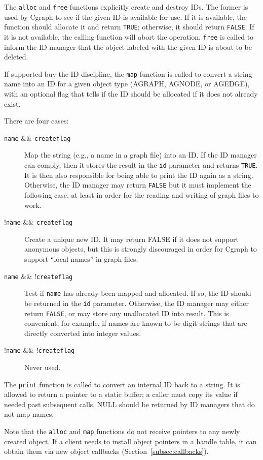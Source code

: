 \documentclass[11pt,letterpaper]{article}
\begin{document}
The \verb"alloc" and \verb"free" functions explicitly create and destroy IDs.  
The former is used by Cgraph to see if the given ID is available for use. If it is available, the function 
should allocate it and return \verb"TRUE"; otherwise, it should return \verb"FALSE".
If it is not available, the calling function will abort the operation.
\verb"free" is called to inform the ID manager that the object labeled with the given ID is about to be
deleted.

If supported buy the ID discipline, the \verb"map" function is called 
to convert a string name into an ID for a given object type 
(AGRAPH, AGNODE, or AGEDGE), with an optional flag that tells if the 
ID should be allocated if it does not already exist. 

There are four cases:
\begin{description}
\item[{\tt name} \&\& {\tt createflag}] 
Map the string (e.g., a name in a graph file) 
into an ID. If the ID manager can comply, then it stores the result 
in the \verb"id" parameter and returns \verb"TRUE". It is then also responsible for
being able to print the ID again as a string. Otherwise, the ID manager 
may return \verb"FALSE" but it must implement the following case, at least 
in order for the reading and writing of graph files to work.
\item[!{\tt name} \&\& {\tt createflag}]  
Create a unique new ID. It may return FALSE if it does not support 
anonymous objects, but this is strongly discouraged
in order for Cgraph to support ``local names'' in graph files.
\item[{\tt name} \&\& !{\tt createflag}]
Test if \verb"name" has already been mapped and allocated. If so, the ID
should be returned in the \verb"id" parameter.
Otherwise, the ID manager may
either return \verb"FALSE", or may store any unallocated ID into result. 
This is convenient, for example, if names
are known to be digit strings that are directly converted into integer values.
\item[!{\tt name} \&\& !{\tt createflag}] Never used.  
\end{description}

The \verb"print" function is called to convert an internal ID back to a string.
It is allowed to return a pointer to a static buffer; 
a caller must copy its value if needed past subsequent calls. 
NULL should be returned by ID managers that do not map names.

Note that the \verb"alloc" and \verb"map" functions do not receive pointers to any 
newly created object. If a client needs to install object pointers in a handle table, 
it can obtain them via new object callbacks (Section~\ref{subsec:callbacks}).
\end{document}
